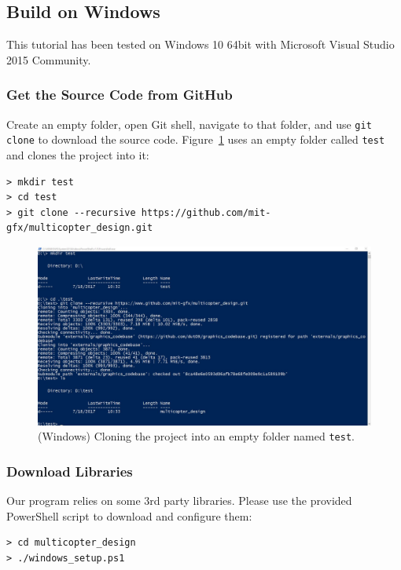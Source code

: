 \subsection{Build on Windows}
This tutorial has been tested on Windows 10 64bit with Microsoft Visual Studio 2015 Community.

\subsubsection{Get the Source Code from GitHub}
Create an empty folder, open Git shell, navigate to that folder, and use \texttt{git clone} to download the source code. Figure~\ref{fig:windows_git_clone} uses an empty folder called \texttt{test} and clones the project into it:
\begin{verbatim}
> mkdir test
> cd test
> git clone --recursive https://github.com/mit-gfx/multicopter_design.git
\end{verbatim}

\begin{figure}[!htb]
	\centering
	\includegraphics[width=0.75\linewidth]{windows_git_clone}
	\caption{(Windows) Cloning the project into an empty folder named \texttt{test}.}
	\label{fig:windows_git_clone}
\end{figure}

\subsubsection{Download Libraries}
Our program relies on some 3rd party libraries. Please use the provided PowerShell script to download and configure them:
\begin{verbatim}
> cd multicopter_design
> ./windows_setup.ps1
\end{verbatim}

